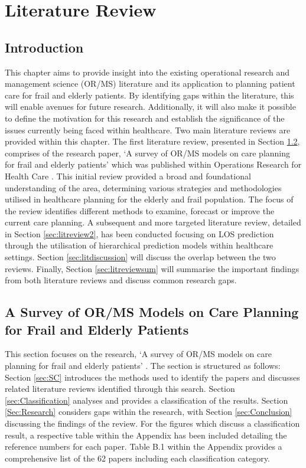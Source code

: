 \documentclass[../thesis.tex]{subfiles}
\begin{document}
\chapter{Literature Review}\label{chp:LiteratureReview}

\section{Introduction}
This chapter aims to provide insight into the existing operational research and management science (OR/MS) literature and its application to planning patient care for frail and elderly patients. By identifying gaps within the literature, this will enable avenues for future research. Additionally, it will also make it possible to define the motivation for this research and establish the significance of the issues currently being faced within healthcare. Two main literature reviews are provided within this chapter. The first literature review, presented in Section \ref{sec:litreview1}, comprises of the research paper, `A survey of OR/MS models on care planning for frail and elderly patients' which was published within Operations Research for Health Care \cite{Williams2021}. This initial review provided a broad and foundational understanding of the area, determining various strategies and methodologies utilised in healthcare planning for the elderly and frail population. The focus of the review identifies different methods to examine, forecast or improve the current care planning. A subsequent and more targeted literature review, detailed in Section \ref{sec:litreview2}, has been conducted focusing on LOS prediction through the utilisation of hierarchical prediction models within healthcare settings. Section \ref{sec:litdiscussion} will discuss the overlap between the two reviews. Finally, Section \ref{sec:litreviewsum} will summarise the important findings from both literature reviews and discuss common research gaps.

\section{A Survey of OR/MS Models on Care Planning for Frail and Elderly Patients}\label{sec:litreview1}

This section focuses on the research, `A survey of OR/MS models on care planning for frail and elderly patients' \cite{Williams2021}. The section is structured as follows: Section \ref{sec:SC} introduces the methods used to identify the papers and discusses related literature reviews identified through this search. Section \ref{sec:Classification} analyses and provides a classification of the results. Section \ref{Sec:Research} considers gaps within the research, with Section \ref{sec:Conclusion} discussing the findings of the review. For the figures which discuss a classification result, a respective table within the Appendix has been included detailing the reference numbers for each paper. Table B.1 within the Appendix provides a comprehensive list of the 62 papers including each classification category.
\end{document}
